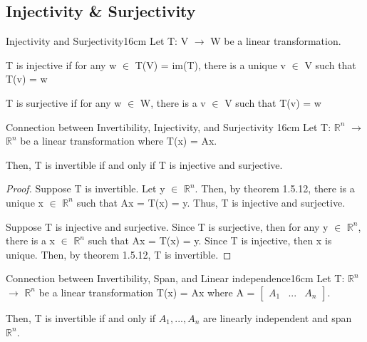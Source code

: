     \newpage





\subsection{ Injectivity \& Surjectivity }

    \begin{definition}{Injectivity and Surjectivity}{16cm}
        Let T: V $\rightarrow$ W be a linear transformation.

        T is {\color{lblue} injective} if for any w $\in$ T(V) = im(T),
        there is a unique v $\in$ V such that T(v) = w

        T is {\color{lblue} surjective} if for any w $\in$ W,
        there is a v $\in$ V such that T(v) = w
    \end{definition}

    \vspace{0.5cm}



    \begin{wtheorem}{Connection between Invertibility, Injectivity,
    and Surjectivity }{16cm}
        Let T: $\mathbb{R}^n$ $\rightarrow$ $\mathbb{R}^n$
        be a linear transformation where T(x) = Ax.
        
        Then, T is invertible if and only if T is injective and surjective.
    \end{wtheorem}

    \begin{proof}
        Suppose T is invertible.
        Let y $\in$ $\mathbb{R}^n$.
        Then, by {\color{red} theorem 1.5.12},
        there is a unique x $\in$ $\mathbb{R}^n$ such that Ax = T(x) = y.
        Thus, T is injective and surjective.

        \vspace{0.2cm}

        Suppose T is injective and surjective.
        Since T is surjective, then for any y $\in$ $\mathbb{R}^n$,
        there is a x $\in$ $\mathbb{R}^n$ such that Ax = T(x) = y.
        Since T is injective, then x is unique.
        Then, by {\color{red} theorem 1.5.12}, T is invertible.
    \end{proof}

    \vspace{0.5cm}



    \begin{wtheorem}{Connection between Invertibility, Span, and
    Linear independence}{16cm}
        Let T: $\mathbb{R}^n$ $\rightarrow$ $\mathbb{R}^n$
        be a linear transformation T(x) = Ax where A =
        $\begin{bmatrix}
            A_1 & ... & A_n
        \end{bmatrix}$.

        Then, T is invertible if and only if $A_1,...,A_n$
        are linearly independent and span $\mathbb{R}^n$.
    \end{wtheorem}

